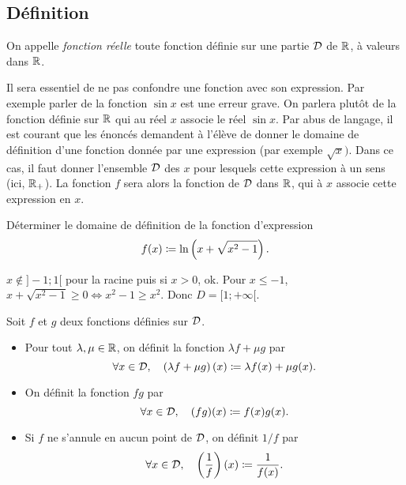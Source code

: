 \documentclass{magnolia}
\begin{document}
\subsection{Définition}
\begin{definition}[utile=-3]
On appelle \emph{fonction réelle} toute fonction définie sur une partie $\mathcal{D}$ de $\mathbb{R}$,
à valeurs dans $\mathbb{R}$.
\end{definition}

\begin{remarques}
\remarque Il sera essentiel de ne pas confondre une fonction avec son
  expression.
  Par exemple parler de la fonction $\sin x$ est une erreur grave. On
  parlera plutôt de la fonction définie sur $\mathbb{R}$ qui au réel $x$ associe le
  réel $\sin x$.
\remarque Par abus de langage, il est courant que les énoncés demandent à
  l'élève de donner le domaine de définition d'une fonction donnée par une
  expression (par exemple $\sqrt{x})$. Dans ce cas, il faut donner l'ensemble
  $\mathcal{D}$ des $x$ pour lesquels cette expression à un sens (ici, $\mathbb{R}_+$). La
  fonction $f$ sera alors la fonction de
  $\mathcal{D}$ dans $\mathbb{R}$, qui à $x$ associe cette expression en $x$.
\end{remarques}

\begin{exoUnique}
\exo Déterminer le domaine de définition de la fonction d'expression
  \[f(x)\coloneqq\ln\left(x+\sqrt{x^2-1}\right).\]
\end{exoUnique}
\begin{sol}
$x\notin]-1;1[$ pour la racine puis si $x>0$, ok. Pour $x\leq -1$, $x+\sqrt{x^2-1}\geq 0 \Longleftrightarrow x^2-1\geq x^2$. Donc $D=[1;+\infty[$.
\end{sol}

\begin{definition}[utile=-3]
Soit $f$ et $g$ deux fonctions définies sur $\mathcal{D}$.
\begin{itemize}
\item Pour tout $\lambda,\mu\in\mathbb{R}$, on définit la fonction $\lambda f+\mu g$
  par
  \[\forall x\in\mathcal{D} ,\quad \left(\lambda f+\mu g\right)(x)\coloneqq
    \lambda f(x)+\mu g(x).\]
\item On définit la fonction $fg$ par
  \[\forall x\in\mathcal{D} ,\quad (fg)(x)\coloneqq f(x)g(x).\]
\item Si $f$ ne s'annule en aucun point de $\mathcal{D}$, on définit $1/f$ par
  \[\forall x\in\mathcal{D} ,\quad \left(\frac{1}{f}\right)(x)\coloneqq\frac{1}{f(x)}.\]
\end{itemize}
\end{definition}
\end{document}
